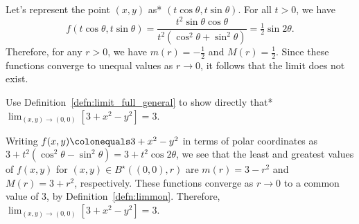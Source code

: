 \documentclass{watsonbook}
\begin{document}
\begin{solution}
  Let's represent the point $(x,y)$ as*  $(t \cos \theta, t\sin \theta)$. For all $t > 0$,
  we have
  \[
    f(t\cos\theta, t\sin \theta) = \frac{ t^2 \sin \theta \cos
      \theta}{t^2(\cos^2 \theta + \sin^2 \theta)} = \tfrac{1}{2} \sin
    2\theta. 
  \]
  Therefore, for any $r > 0$, we have $m(r) = -\tfrac{1}{2}$ and $M(r) =
  \tfrac{1}{2}$. Since these functions converge to unequal values as
  $r \to 0$, it follows that the limit does not exist. 
\end{solution}

\begin{example}{}{}
  Use Definition~\ref{defn:limit_full_general} to show directly that*
  $\displaystyle{\lim_{(x,y) \to (0,0)} \left[3 + x^2 - y^2\right] =
    3}$.
\end{example}

\begin{solution}
  Writing $f(x,y) \colonequals 3 + x^2 - y^2$ in terms of polar
  coordinates as
  $3 + t^2(\cos^2 \theta - \sin^2 \theta) = 3 +t^2 \cos2\theta$, we
  see that the least and greatest values of $f(x,y)$ for
  $(x,y) \in B^\star((0,0),r)$ are $m(r) = 3-r^2$ and
  $M(r) = 3 + r^2$, respectively. These functions converge as $r\to 0$
  to a common value of $3$, by
  Definition~\ref{defn:limmon}. Therefore,
  $\displaystyle{\lim_{(x,y) \to (0,0)} \left[3 + x^2 - y^2\right] =
    3}$.
\end{solution}
\end{document}
